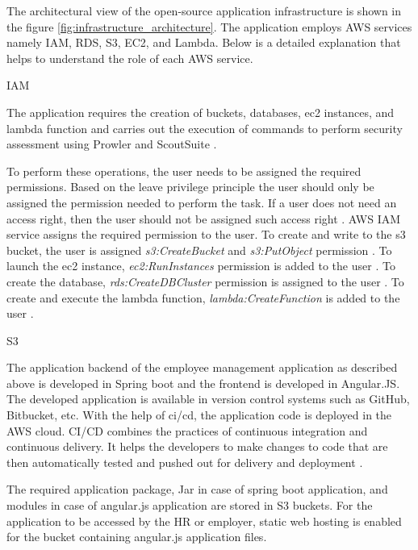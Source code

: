 \par The architectural view of the open-source
application infrastructure is shown in the figure
\ref{fig:infrastructure_architecture}.
The application employs AWS services namely IAM, RDS, S3, EC2, and Lambda.
Below is a detailed explanation that helps to understand the role of each AWS service.

\par IAM

\par The application requires the creation of buckets, databases, ec2 instances, and lambda function and carries out the
execution of commands to perform security assessment
using Prowler and ScoutSuite \cite{79}.

\par To perform these operations, the user needs to be assigned the required permissions.
Based on the leave privilege principle the user should only be assigned the permission needed to perform the task.
If a user does not need an access right, then the user should not be assigned such access right \cite{80}.
AWS IAM service assigns the required permission to the user.
To create and write to the s3 bucket, the user is
assigned \textit{s3:CreateBucket} and \textit{s3:PutObject} permission \cite{81}.
To launch the ec2 instance, \textit{ec2:RunInstances}
permission is added to the user \cite{82}.
To create the database, \textit{rds:CreateDBCluster}
permission is assigned to the user \cite{83}.
To create and execute the lambda function,
\textit{lambda:CreateFunction} is added to the user \cite{84}.
\hfill \break
\par S3

\par The application backend of the employee management application as described above is developed in Spring boot and the frontend is developed in Angular.JS. The developed application is available in version control systems such as GitHub, Bitbucket, etc.
With the help of \gls{ci}/\gls{cd}, the application code is
deployed
in the AWS cloud.
CI/CD combines the practices of continuous integration and continuous delivery.
It helps the developers to make changes to code that are
then automatically tested and pushed out for delivery and
deployment \cite{85}.

\par The required application package, Jar in case of spring boot application, and modules in case of angular.js application are stored in S3 buckets.
For the application to be accessed by the HR or employer,
static web hosting is enabled for the bucket containing angular.js application files.


